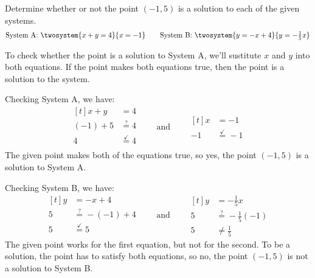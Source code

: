 \begin{boxex}
Determine whether or not the point $(-1,5)$ is a solution to each of the given systems.
\[
\text{System A: }\twosystem{x+y=4}{x=-1}
\qquad
\text{System B: }\twosystem{y=-x+4}{y=-\tfrac{1}{5}x}
\] 


To check whether the point is a solution to System A, we'll sustitute $x$ and $y$ into both equations. If the point makes both equations true, then the point is a solution to the system.

Checking System A, we have:
\[
\begin{aligned}[t]
x+y		&=4\\
(-1)+5	&\overset{?}{=}4\\
4 		&\overset{\checkmark}{=} 4\\
\end{aligned}
\qquad\text{and}\qquad
\begin{aligned}[t]
x 	&= -1\\
-1	&\overset{\checkmark}{=}  -1
\end{aligned}
\]
The given point makes both of the equations true, so yes, the point $(-1,5)$ is a solution to System A.

Checking System B, we have:
\[
\begin{aligned}[t]
y		&=-x+4\\
5		&\overset{?}{=}-(-1)+4\\
5 		&\overset{\checkmark}{=} 5\\
\end{aligned}
\qquad\text{and}\qquad
\begin{aligned}[t]
y 	&= -\tfrac{1}{5}x\\
5	&\overset{?}{=} -\tfrac{1}{5}(-1)\\
5	&\neq \tfrac{1}{5}
\end{aligned}
\] 
The given point works for the first equation, but not for the second. To be a solution, the point has to satisfy both equations, so no, the point $(-1,5)$ is not a solution to System B.
\end{boxex}

